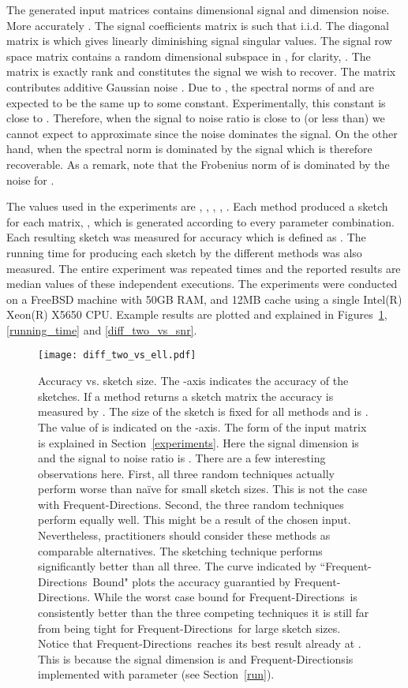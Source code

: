 \documentclass[]{article}
\newcommand{\FD}{Frequent-Directions}
\newcommand{\myfigurewidth}{0.7}
\begin{document}
The generated input matrices  contains  dimensional signal and  dimension noise. 
More accurately .
The signal coefficients matrix  is such that  i.i.d.
The diagonal matrix  is  which gives linearly diminishing signal singular values. 
The signal row space matrix  contains a random  dimensional subspace in , for clarity, .
The matrix  is exactly rank  and constitutes the signal we wish to recover. 
The matrix  contributes additive Gaussian noise . 
Due to \cite{Vershynin08prodOfRandMatrices}, the spectral norms of  and  are expected to be the same up to some constant.
Experimentally, this constant is close to .
Therefore, when the signal to noise ratio  is close to (or less than)  we cannot expect to approximate  since the noise dominates the signal.
On the other hand, when  the spectral norm is dominated by the signal which is therefore recoverable.
As a remark, note that the Frobenius norm of  is dominated by the noise for .

The values used in the experiments are , , , , .
Each method produced a sketch for each matrix, , which is generated according to every parameter combination.
Each resulting sketch  was measured for accuracy which is defined as .
The running time for producing each sketch by the different methods was also measured.
The entire experiment was repeated  times and the reported results are median values of these independent executions.
The experiments were conducted on a FreeBSD machine with 50GB RAM, and 12MB cache using a single Intel(R) Xeon(R) X5650 CPU.  
Example results are plotted and explained in Figures~\ref{diff_two_vs_ell}, \ref{running_time} and  \ref{diff_two_vs_snr}.

\begin{figure}[htbp]
\begin{center}
\texttt{[image: diff\_two\_vs\_ell.pdf]}
\caption{Accuracy vs. sketch size. The -axis indicates the accuracy of the sketches.
If a method returns a sketch matrix  the accuracy is measured by .
The size of the sketch is fixed for all methods and is .
The value of  is indicated on the -axis.
The form of the input matrix is explained in Section~\ref{experiments}. 
Here the signal dimension is  and the signal to noise ratio is .
There are a few interesting observations here. First, all three random techniques actually perform worse than
na\"ive for small sketch sizes. This is not the case with \FD. 
Second, the three random techniques perform equally well. This might be a result of the chosen input.
Nevertheless, practitioners should consider these methods as comparable alternatives.
The sketching technique performs significantly better than all three.
The curve indicated by ``\FD~Bound" plots the accuracy guarantied by \FD. 
While the worst case bound for \FD~is consistently better than the three competing techniques
it is still far from being tight for \FD~for large sketch sizes. 
Notice that \FD~reaches its best result already at .
This is because the signal dimension is  and \FD is implemented with parameter  (see Section~\ref{run}).
}
\label{diff_two_vs_ell}
\end{center}
\end{figure}
\end{document}
